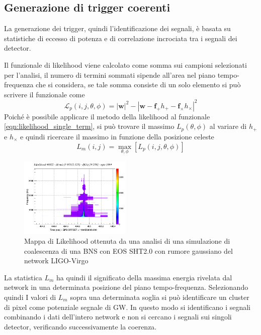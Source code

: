 \subsection{Generazione di trigger coerenti}
\label{section:coherent_trigger}
La generazione dei trigger, quindi l'identificazione dei segnali, è basata su statistiche di eccesso di potenza e di correlazione incrociata tra i segnali dei detector. 

Il funzionale di likelihood viene calcolato come somma sui campioni selezionati per l'analisi, il numero di termini sommati sipende all'area nel piano tempo-frequenza che si considera, se tale somma consiste di un solo elemento si può scrivere il funzionale come
\begin{equation}
	\mathcal{L}_p(i,j,\theta,\phi)=|\mathbf{w}|^2 -|\mathbf{w} - \mathbf{f}_+h_+ - \mathbf{f}_\times h_\times|^2
	\label{eqn:likelihood_single_term}
\end{equation}
Poiché è possibile applicare il metodo della likelihood al funzionale \ref{eqn:likelihood_single_term}, si può trovare il massimo $L_p(\theta, \phi)$ al variare di $h_+$ e $h_\times$ e quindi ricercare il massimo in funzione della posizione celeste
\begin{equation}
	L_m(i,j)= \max_{\theta, \phi}[L_p(i,j,\theta,\phi)]
	\label{eqn:max_L}
\end{equation}
\begin{figure}
	\vspace{-20pt}
	\begin{center}
		\includegraphics[width=0.475\textwidth]{figures/Capitolo_3/l_tfmap_scalogram.png}
	\end{center}
	\vspace{-5pt}
	\caption{Mappa di Likelihood ottenuta da una analisi di una simulazione di coalescenza di una BNS con EOS SHT2.0 con rumore gaussiano del network LIGO-Virgo}
	\label{fig:Likelihood_example}
	\vspace{-10pt}
\end{figure}
La statistica $L_m$ ha quindi il significato della massima energia rivelata dal network in una determinata posizione del piano tempo-frequenza. Selezionando quindi I valori di $L_m$ sopra una determinata soglia si può identificare un cluster di pixel come potenziale segnale di GW. In questo modo si identificano i segnali combinando i dati dell'intero network e non si cercano i segnali sui singoli detector, verificando successivamente la coerenza.
